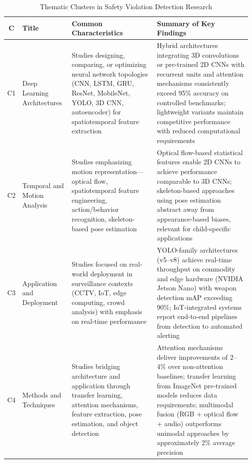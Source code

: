 \documentclass[conference]{IEEEtran}
\begin{document}
\begin{table}[t]
\caption{Thematic Clusters in Safety Violation Detection Research}
\begin{center}
\footnotesize
\setlength{\tabcolsep}{4pt}
\renewcommand{\arraystretch}{1.2}
\begin{tabular}{|c|p{2.2cm}|p{5.0cm}|p{5.0cm}|}
\hline
\textbf{C} & \textbf{Title} & \textbf{Common Characteristics} & \textbf{Summary of Key Findings} \\
\hline
C1 & Deep Learning Architectures & Studies designing, comparing, or optimizing neural network topologies (CNN, LSTM, GRU, ResNet, MobileNet, YOLO, 3D CNN, autoencoder) for spatiotemporal feature extraction & Hybrid architectures integrating 3D convolutions or pre-trained 2D CNNs with recurrent units and attention mechanisms consistently exceed 95\% accuracy on controlled benchmarks; lightweight variants maintain competitive performance with reduced computational requirements \\
\hline
C2 & Temporal and Motion Analysis & Studies emphasizing motion representation---optical flow, spatiotemporal feature engineering, action/behavior recognition, skeleton-based pose estimation & Optical flow-based statistical features enable 2D CNNs to achieve performance comparable to 3D CNNs; skeleton-based approaches using pose estimation abstract away from appearance-based biases, relevant for child-specific applications \\
\hline
C3 & Application and Deployment & Studies focused on real-world deployment in surveillance contexts (CCTV, IoT, edge computing, crowd analysis) with emphasis on real-time performance & YOLO-family architectures (v5--v8) achieve real-time throughput on commodity and edge hardware (NVIDIA Jetson Nano) with weapon detection mAP exceeding 90\%; IoT-integrated systems report end-to-end pipelines from detection to automated alerting \\
\hline
C4 & Methods and Techniques & Studies bridging architecture and application through transfer learning, attention mechanisms, feature extraction, pose estimation, and object detection & Attention mechanisms deliver improvements of 2--4\% over non-attention baselines; transfer learning from ImageNet pre-trained models reduces data requirements; multimodal fusion (RGB + optical flow + audio) outperforms unimodal approaches by approximately 2\% average precision \\
\hline
\end{tabular}
\label{tab:clusters}
\end{center}
\end{table}
\end{document}
